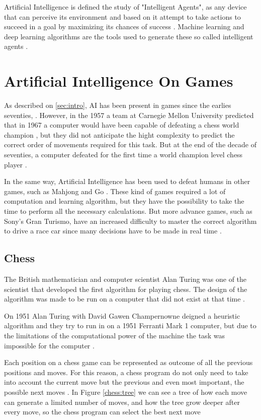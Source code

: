 \documentclass[conference]{IEEEtran}
\begin{document}
Artificial Intelligence is defined the study of "Intelligent Agents", as any device that can perceive its environment and based on it attempt to take actions to succeed in a goal by maximizing its chances of success \cite{ai}. Machine learning and deep learning algorithms are the tools used to generate these so called intelligent agents \cite{ai}.


\section{Artificial Intelligence On Games}

As described on \ref{sec:intro}, AI has been present in games since the earlies seventies, 
\cite{sony}. However, in the 1957  a team at Carnegie Mellon University predicted that in 1967 a computer would have been capable of defeating a chess world champion \cite{euristic}, but they did not anticipate the hight complexity to predict the correct order of movements required for this task. But at the end of the decade of seventies, a computer defeated for the first time a world champion level chess player \cite{bad}.

In the same way, Artificial Intelligence has been used to defeat humans in other games, such as Mahjong and Go \cite{sony}. These kind of games required a lot of computation and learning algorithm, but they have the possibility to take the time to perform all the necessary calculations. But more advance games, such as Sony's Gran Turismo, have an increased difficulty to master the correct algorithm to drive a race car since many decisions have to be made in real time \cite{sony}.

\subsection{Chess}

The British mathematician and computer scientist Alan Turing was one of the scientist that developed the first algorithm for playing chess. The design of the algorithm was made to be run on a computer that did not exist at that time \cite{how}.

On 1951 Alan Turing with David Gawen Champernowne deigned a heuristic algorithm and they try to run in on a 1951 Ferranti Mark 1 computer, but due to the limitations of the computational power of the machine the task was impossible for the computer \cite{how}.

Each position on a chess game can be represented as outcome of all the previous positions and moves. For this reason, a chess program do not only need to take into account the current move but the previous and even most important, the possible next moves \cite{how}. In Figure \ref{chess:tree} we can see a tree of how each move can generate a limited number of moves, and how the tree grow deeper after every move, so the chess program can select the best next move \cite{how}
\end{document}

